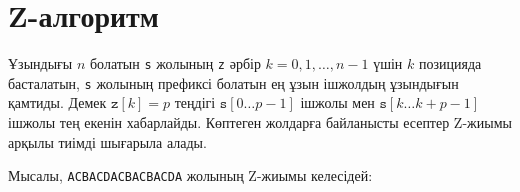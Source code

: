 
\section{Z-алгоритм}


Ұзындығы $n$ болатын \texttt{s} жолының  \texttt{z}
әрбір $k=0,1,\ldots,n-1$ үшін $k$ позицияда басталатын,
\texttt{s} жолының префиксі болатын ең ұзын ішжолдың ұзындығын қамтиды.
Демек $\texttt{z}[k]=p$ теңдігі $\texttt{s}[0 \ldots p-1]$ ішжолы
мен $\texttt{s}[k \ldots k+p-1]$ ішжолы тең екенін хабарлайды.
Көптеген жолдарға байланысты есептер Z-жиымы арқылы тиімді 
шығарыла алады.


Мысалы, \texttt{ACBACDACBACBACDA} жолының 
Z-жиымы келесідей:

